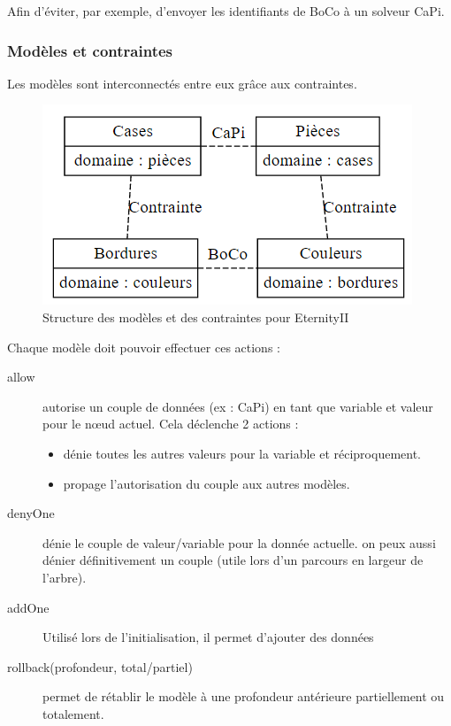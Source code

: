 \begin{exmp}
	Afin d'éviter, par exemple, d'envoyer les identifiants de BoCo à un solveur CaPi.
\end{exmp}

\subsubsection{Modèles et contraintes}

Les modèles sont interconnectés entre eux grâce aux contraintes.

\begin{figure}[H]
	\includegraphics[width=\linewidth]{images/modeles_contraintes}
	\caption{Structure des modèles et des contraintes pour EternityII}
	\label{fig:modeles_contraintes}
\end{figure}

Chaque modèle doit pouvoir effectuer ces actions :

\begin{description}
	\item[allow] autorise un couple de données (ex : CaPi) en tant que variable et valeur pour le n\oe ud actuel. Cela déclenche 2 actions : 
	\begin{itemize}
		\item dénie toutes les autres valeurs pour la variable et réciproquement.
		\item propage l'autorisation du couple aux autres modèles.
	\end{itemize}
	\item[denyOne] dénie le couple de valeur/variable pour la donnée actuelle. on peux aussi dénier définitivement un couple (utile lors d'un parcours en largeur de l'arbre).
	\item[addOne] Utilisé lors de l'initialisation, il permet d'ajouter des données
	\item[rollback(profondeur, total/partiel)] permet de rétablir le modèle à une profondeur antérieure partiellement ou totalement.
\end{description}
\newpage

